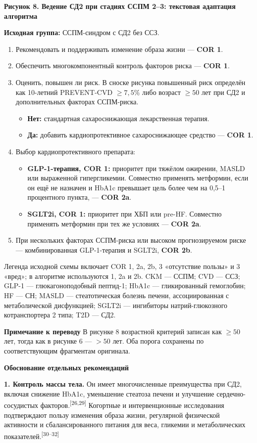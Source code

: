 \documentclass[11pt,a4paper]{article}
\newcommand{\src}[1]{\textsuperscript{[#1]}}
\newcommand{\editorial}[1]{\par\begingroup\small\color{black!70}\textbf{Примечание к переводу} #1\par\endgroup}
\newcommand{\heading}[1]{\par\medskip\textbf{#1}\par}
\begin{document}
\heading{Рисунок 8. Ведение СД2 при стадиях ССПМ 2--3: текстовая адаптация алгоритма}
\textbf{Исходная группа:} ССПМ-синдром с СД2 без ССЗ.
\begin{enumerate}[label=\arabic*.]
\item Рекомендовать и поддерживать изменение образа жизни --- \textbf{COR 1}.
\item Обеспечить многокомпонентный контроль факторов риска --- \textbf{COR 1}.
\item Оценить, повышен ли риск. В сноске рисунка повышенный риск определён как 10-летний PREVENT-CVD $\geq7{,}5\%$ либо возраст $\geq50$ лет при СД2 и дополнительных факторах ССПМ-риска.
\begin{itemize}
\item \textbf{Нет:} стандартная сахароснижающая лекарственная терапия.
\item \textbf{Да:} добавить кардиопротективное сахароснижающее средство --- \textbf{COR 1}.
\end{itemize}
\item Выбор кардиопротективного препарата:
\begin{itemize}
\item \textbf{GLP-1-терапия, COR 1:} приоритет при тяжёлом ожирении, MASLD или выраженной гипергликемии. Совместно применять метформин, если он ещё не назначен и HbA1c превышает цель более чем на 0,5--1 процентного пункта, --- \textbf{COR 2a}.
\item \textbf{SGLT2i, COR 1:} приоритет при ХБП или pre-HF. Совместно применять метформин при тех же условиях --- \textbf{COR 2a}.
\end{itemize}
\item При нескольких факторах ССПМ-риска или высоком прогнозируемом риске --- комбинированная GLP-1-терапия и SGLT2i, \textbf{COR 2b}.
\end{enumerate}
Легенда исходной схемы включает COR 1, 2a, 2b, 3 «отсутствие пользы» и 3 «вред»; в алгоритме используются 1, 2a и 2b. CKM --- ССПМ; CVD --- ССЗ; GLP-1 --- глюкагоноподобный пептид-1; HbA1c --- гликированный гемоглобин; HF --- СН; MASLD --- стеатотическая болезнь печени, ассоциированная с метаболической дисфункцией; SGLT2i --- ингибиторы натрий-глюкозного котранспортера 2 типа; T2D --- СД2.
\editorial{В рисунке 8 возрастной критерий записан как $\geq50$ лет, тогда как в рисунке 6 --- $>50$ лет. Оба порога сохранены по соответствующим фрагментам оригинала.}

\heading{Обоснование отдельных рекомендаций}
\textbf{1. Контроль массы тела.} Он имеет многочисленные преимущества при СД2, включая снижение HbA1c, уменьшение стеатоза печени и улучшение сердечно-сосудистых факторов.\src{26,29} Когортные и интервенционные исследования подтверждают пользу изменения образа жизни, регулярной физической активности и сбалансированного питания для веса, гликемии и метаболических показателей.\src{30--32}
\end{document}
